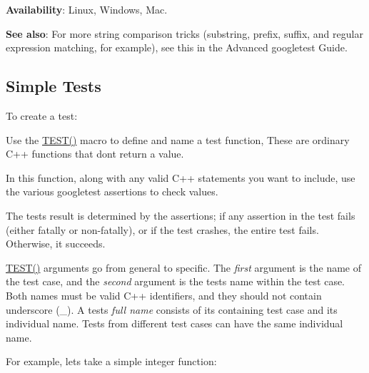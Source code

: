 {\bfseries{Availability}}\+: Linux, Windows, Mac.

{\bfseries{See also}}\+: For more string comparison tricks (substring, prefix, suffix, and regular expression matching, for example), see this in the Advanced googletest Guide.

\subsection*{Simple Tests}

To create a test\+:


\begin{DoxyEnumerate}
\item Use the {\ttfamily \mbox{\hyperlink{gtest_8h_ad8b332753515c0ab8baada563c2547eb}{T\+E\+S\+T()}}} macro to define and name a test function, These are ordinary C++ functions that don\textquotesingle{}t return a value.
\end{DoxyEnumerate}
\begin{DoxyEnumerate}
\item In this function, along with any valid C++ statements you want to include, use the various googletest assertions to check values.
\end{DoxyEnumerate}
\begin{DoxyEnumerate}
\item The test\textquotesingle{}s result is determined by the assertions; if any assertion in the test fails (either fatally or non-\/fatally), or if the test crashes, the entire test fails. Otherwise, it succeeds.
\end{DoxyEnumerate}


\begin{DoxyCode}{0}
\DoxyCodeLine{\}}
\end{DoxyCode}


{\ttfamily \mbox{\hyperlink{gtest_8h_ad8b332753515c0ab8baada563c2547eb}{T\+E\+S\+T()}}} arguments go from general to specific. The {\itshape first} argument is the name of the test case, and the {\itshape second} argument is the test\textquotesingle{}s name within the test case. Both names must be valid C++ identifiers, and they should not contain underscore ({\ttfamily \+\_\+}). A test\textquotesingle{}s {\itshape full name} consists of its containing test case and its individual name. Tests from different test cases can have the same individual name.

For example, let\textquotesingle{}s take a simple integer function\+:


